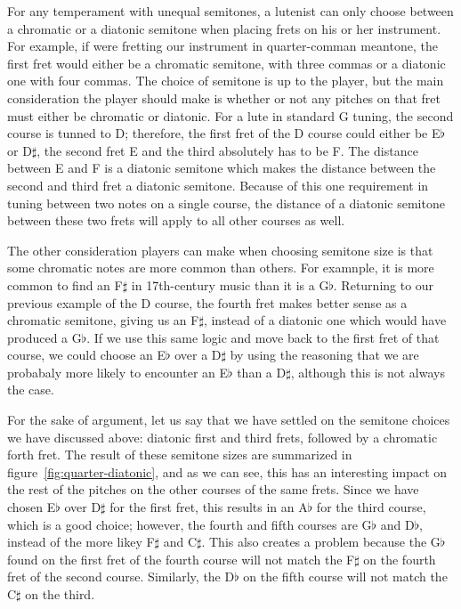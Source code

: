For any temperament with unequal semitones, a lutenist can only choose between a chromatic
or a diatonic semitone when placing frets on his or her instrument.  For example, if were
fretting our instrument in quarter-comman meantone, the first fret would either be a
chromatic semitone, with three commas or a diatonic one with four commas.  The choice of
semitone is up to the player, but the main consideration the player should make is whether
or not any pitches on that fret must either be chromatic or diatonic.  For a lute in
standard G tuning, the second course is tunned to D; therefore, the first fret of the D
course could either be E$\flat$ or D$\sharp$, the second fret E and the third absolutely
has to be F.  The distance between E and F is a diatonic semitone which makes the distance
between the second and third fret a diatonic semitone.  Because of this one requirement in
tuning between two notes on a single course, the distance of a diatonic semitone between
these two frets will apply to all other courses as well.

The other consideration players can make when choosing semitone size is that some
chromatic notes are more common than others.  For examnple, it is more common to find an
F$\sharp$ in 17th-century music than it is a G$\flat$.  Returning to our previous example
of the D course, the fourth fret makes better sense as a chromatic semitone, giving us an
F$\sharp$, instead of a diatonic one which would have produced a G$\flat$.  If we use this
same logic and move back to the first fret of that course, we could choose an E$\flat$
over a D$\sharp$ by using the reasoning that we are probabaly more likely to encounter an
E$\flat$ than a D$\sharp$, although this is not always the case.

For the sake of argument, let us say that we have settled on the semitone choices we have
discussed above: diatonic first and third frets, followed by a chromatic forth fret.  The
result of these semitone sizes are summarized in figure~\ref{fig:quarter-diatonic}, and as
we can see, this has an interesting impact on the rest of the pitches on the other courses
of the same frets.  Since we have chosen E$\flat$ over
D$\sharp$ for the first fret, this results in an A$\flat$ for the third course, which is a
good choice; however, the fourth and fifth courses are G$\flat$ and D$\flat$, instead of
the more likey F$\sharp$ and C$\sharp$. This also creates a problem because the G$\flat$
found on the first fret of the fourth course will not match the F$\sharp$ on the fourth
fret of the second course. Similarly, the D$\flat$ on the fifth course will not match the
C$\sharp$ on the third.

